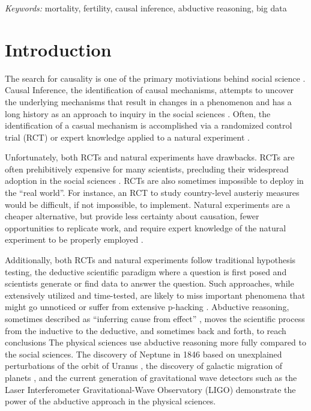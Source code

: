 \documentclass[12pt]{article}
\begin{document}
\noindent%
{\it Keywords:} mortality, fertility, causal inference, abductive
reasoning, big data
\vfill

\newpage
{} %

\newpage

\hypertarget{introduction}{%
\section{Introduction}\label{introduction}}

The search for causality is one of the primary motiviations behind
social science \citep{smith2011commentary, pearl2009causal}. Causal
Inference, the identification of causal mechanisms, attempts to uncover
the underlying mechanisms that result in changes in a phenomenon and has
a long history as an approach to inquiry in the social sciences
\citep{grimmer2015ppsp}. Often, the identification of a casual mechanism
is accomplished via a randomized control trial (RCT) or expert knowledge
applied to a natural experiment \citep{salganik2019bit}.

Unfortunately, both RCTs and natural experiments have drawbacks. RCTs
are often prehibitively expensive for many scientists, precluding their
widespread adoption in the social sciences \citep{west2008ajph}. RCTs
are also sometimes impossible to deploy in the ``real world''. For
instance, an RCT to study country-level austeriy measures would be
difficult, if not impossible, to implement. Natural experiments are a
cheaper alternative, but provide less certainty about causation, fewer
opportunities to replicate work, and require expert knowledge of the
natural experiment to be properly employed \citep{pearl2018book}.

Additionally, both RCTs and natural experiments follow traditional
hypothesis testing, the deductive scientific paradigm where a question
is first posed and scientists generate or find data to answer the
question. Such approaches, while extensively utilized and time-tested,
are likely to miss important phenomena that might go unnoticed or suffer
from extensive p-hacking
\citep{head2015extent, nuzzo2014scientific, ruggles2014big}. Abductive
reasoning, sometimes described as ``inferring cause from effect''
\citep{Crowder2017}, moves the scientific process from the inductive to
the deductive, and sometimes back and forth, to reach conclusions
\citep{bryant2014realm} The physical sciences use abductive reasoning
more fully compared to the social sciences. The discovery of Neptune in
1846 based on unexplained perturbations of the orbit of Uranus
\citep{popper2005logic}, the discovery of galactic migration of planets
\citep{gomes2005n}, and the current generation of gravitational wave
detectors such as the Laser Interferometer Gravitational-Wave
Observatory (LIGO) \citep{harry2010advanced} demonstrate the power of
the abductive approach in the physical sciences.
\end{document}
